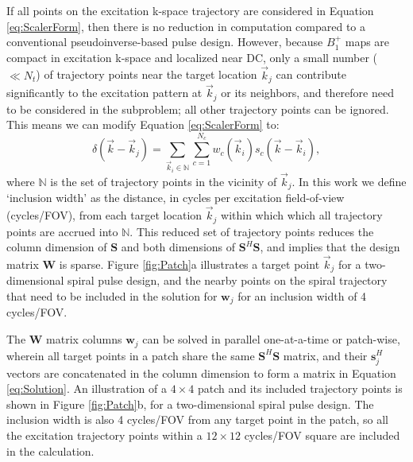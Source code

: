 \par If all points on the excitation k-space trajectory are considered in Equation \ref{eq:ScalerForm},
then there is no reduction in computation compared to a conventional pseudoinverse-based pulse design.
However, because $B_1^+$ maps are compact in excitation k-space and localized near DC,
only a small number ($\ll N_t$) of trajectory points near the target location $\vec{k}_j$ can contribute significantly
to the excitation pattern at $\vec{k}_j$ or its neighbors, 
and therefore need to be considered in the subproblem;
all other trajectory points can be ignored.
This means we can modify Equation \ref{eq:ScalerForm} to:
\begin{equation}
\delta(\vec{k}-\vec{k}_j) = \sum_{\vec{k}_i \in \mathbb{N}}\sum_{c=1}^{N_c} w_c(\vec{k}_i) s_c(\vec{k}-\vec{k}_i),
\end{equation} 
where $\mathbb{N}$ is the set of trajectory points in the vicinity of $\vec{k}_j$. 
In this work we define `inclusion width' as the distance, 
in cycles per excitation field-of-view (cycles/FOV), 
from each target location $\vec{k}_j$ within which which all trajectory points are accrued into $\mathbb{N}$.
This reduced set of trajectory points reduces the column dimension of $\bm{S}$
and both dimensions of $\bm{S}^H\bm{S}$,
and implies that the design matrix $\bm{W}$ is sparse.
Figure \ref{fig:Patch}a illustrates a target point $\vec{k}_j$ for a two-dimensional spiral pulse design, 
and the nearby points on the spiral trajectory that need to be included in the solution for $\bm{w}_j$
for an inclusion width of 4 cycles/FOV.

\par The $\bm{W}$ matrix columns $\bm{w}_j$ can be solved in parallel one-at-a-time or patch-wise, 
wherein all target points in a patch share the same $\bm{S}^{H}\bm{S}$ matrix,
and their $\bm{s}_j^H$ vectors are concatenated in the column dimension
to form a matrix in Equation \ref{eq:Solution}. 
An illustration of a $4 \times 4$ patch and its included trajectory points is shown in Figure \ref{fig:Patch}b,
for a two-dimensional spiral pulse design. 
The inclusion width is also 4 cycles/FOV from any target point in the patch, 
so all the excitation trajectory points within a $12 \times 12$ cycles/FOV square are included in the calculation. 


